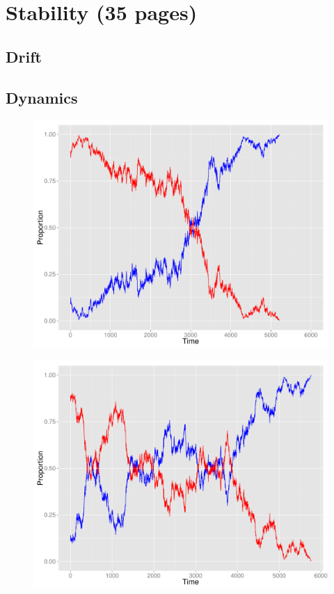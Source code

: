 \chapter{Stability (35 pages)}
\label{Stability}


\section{Drift}

\section{Dynamics}

\begin{figure}
\begin{center}
 \includegraphics[width=\textwidth]{drift}
\end{center}
	\caption{}
	\label{}
\end{figure}


\begin{figure}
\begin{center}
	\includegraphics[width=\textwidth]{selection}
\end{center}
	\caption{}
	\label{}
\end{figure}


